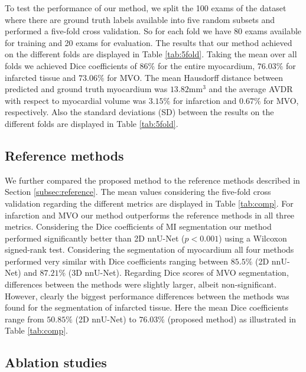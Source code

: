\documentclass[preprint,5p,authoryear]{elsarticle}
\begin{document}
To test the performance of our method, we split the 100 exams of the dataset where there are ground truth labels available into five random subsets and performed a five-fold cross validation. So for each fold we have 80 exams available for training and 20 exams for evaluation. The results that our method achieved on the different folds are displayed in Table \ref{tab:5fold}. Taking the mean over all folds we achieved Dice coefficients of $86 \%$ for the entire myocardium, $76.03 \%$ for infarcted tissue and $73.06\%$ for MVO. The mean Hausdorff distance between predicted and ground truth myocardium was $13.82 \mathrm{mm^3}$ and the average AVDR with respect to myocardial volume was $3.15 \%$ for infarction and $0.67\%$ for MVO, respectively. Also the standard deviations (SD) between the results on the different folds are displayed in Table \ref{tab:5fold}.  


\subsection{Reference methods}

We further compared the proposed method to the reference methods described in Section \ref{subsec:reference}. The mean values considering the five-fold cross validation regarding the different metrics are displayed in Table \ref{tab:comp}. For infarction and MVO our method outperforms the reference methods in all three metrics. Considering the Dice coefficients of MI segmentation our method performed significantly better than 2D nnU-Net ($p<0.001$) using a Wilcoxon signed-rank test. Considering the segmentation of myocardium all four methods performed very similar with Dice coefficients ranging between $85.5 \%$ (2D nnU-Net) and $87.21 \%$ (3D nnU-Net). Regarding Dice scores of MVO segmentation, differences between the methods were slightly larger, albeit non-significant. However, clearly the biggest performance differences between the methods was found for the segmentation of infarcted tissue. Here the mean Dice coefficients range from $50.85 \%$ (2D nnU-Net) to $76.03 \%$ (proposed method) as illustrated in Table \ref{tab:comp}.


\subsection{Ablation studies}
\end{document}
